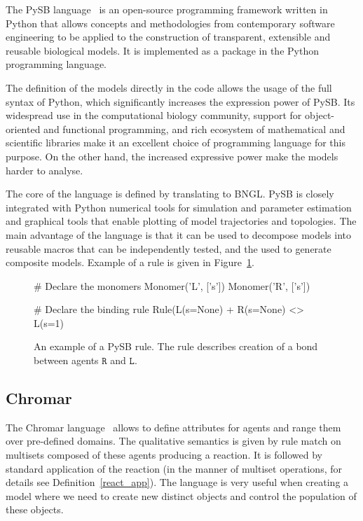 \documentclass[11pt,a4paper]{report}
\begin{document}
The PySB language~\cite{lopez2013programming} is an open-source programming framework written in Python that allows concepts and methodologies from contemporary software engineering to be applied to the construction of transparent, extensible and reusable biological models. It is implemented as a package in the Python programming language. 

The definition of the models directly in the code allows the usage of the full syntax of Python, which significantly increases the expression power of PySB. Its widespread use in the computational biology community, support for object-oriented and functional programming, and rich ecosystem of mathematical and scientific libraries make it an excellent choice of programming language for this purpose. On the other hand, the increased expressive power make the models harder to analyse.

The core of the language is defined by translating to BNGL. PySB is closely integrated with Python numerical tools for simulation and parameter estimation and graphical tools that enable plotting of model trajectories and topologies. The main advantage of the language is that it can be used to decompose models into reusable macros that can be independently tested, and the used to generate composite models. Example of a rule is given in Figure~\ref{pysb_rule}.

\begin{figure}[!h]
\begin{center}
\begin{python}
# Declare the monomers
Monomer('L', ['s'])
Monomer('R', ['s'])

# Declare the binding rule
Rule(L(s=None) +  R(s=None) <> L(s=1) %
\end{python}
\end{center}
\caption{An example of a PySB rule. The rule describes creation of a bond between agents $\mathtt{R}$ and $\mathtt{L}$.}\label{PySB-rule}\label{pysb_rule}
\end{figure}

\subsection{Chromar}

The Chromar language~\cite{honorato2018chromar} allows to define attributes for agents and range them over pre-defined domains. The qualitative semantics is given by rule match on multisets composed of these agents producing a reaction. It is followed by standard application of the reaction (in the manner of multiset operations, for details see Definition~\ref{react_app}). The language is very useful when creating a model where we need to create new distinct objects and control the population of these objects.
\end{document}

